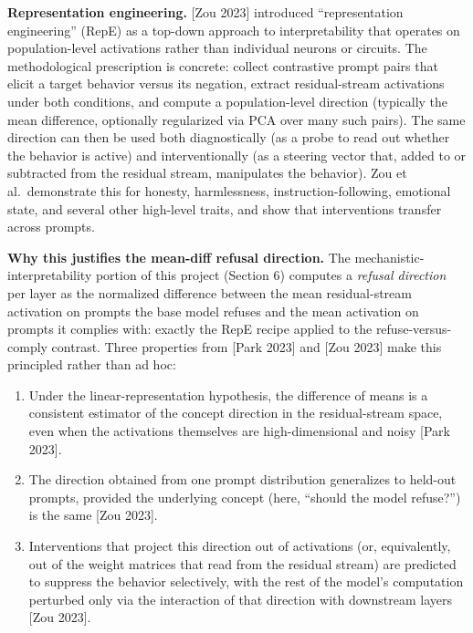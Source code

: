 \documentclass[
  11pt,
]{article}
\providecommand{\tightlist}{%
  \setlength{\itemsep}{0pt}\setlength{\parskip}{0pt}}
\begin{document}
\textbf{Representation engineering.} {[}Zou 2023{]} introduced
``representation engineering'' (RepE) as a top-down approach to
interpretability that operates on population-level activations rather
than individual neurons or circuits. The methodological prescription is
concrete: collect contrastive prompt pairs that elicit a target behavior
versus its negation, extract residual-stream activations under both
conditions, and compute a population-level direction (typically the mean
difference, optionally regularized via PCA over many such pairs). The
same direction can then be used both diagnostically (as a probe to read
out whether the behavior is active) and interventionally (as a steering
vector that, added to or subtracted from the residual stream,
manipulates the behavior). Zou et al.~demonstrate this for honesty,
harmlessness, instruction-following, emotional state, and several other
high-level traits, and show that interventions transfer across prompts.

\textbf{Why this justifies the mean-diff refusal direction.} The
mechanistic-interpretability portion of this project (Section 6)
computes a \emph{refusal direction} per layer as the normalized
difference between the mean residual-stream activation on prompts the
base model refuses and the mean activation on prompts it complies with:
exactly the RepE recipe applied to the refuse-versus-comply contrast.
Three properties from {[}Park 2023{]} and {[}Zou 2023{]} make this
principled rather than ad hoc:

\begin{enumerate}
\def\labelenumi{\arabic{enumi}.}
\tightlist
\item
  Under the linear-representation hypothesis, the difference of means is
  a consistent estimator of the concept direction in the residual-stream
  space, even when the activations themselves are high-dimensional and
  noisy {[}Park 2023{]}.
\item
  The direction obtained from one prompt distribution generalizes to
  held-out prompts, provided the underlying concept (here, ``should the
  model refuse?'') is the same {[}Zou 2023{]}.
\item
  Interventions that project this direction out of activations (or,
  equivalently, out of the weight matrices that read from the residual
  stream) are predicted to suppress the behavior selectively, with the
  rest of the model's computation perturbed only via the interaction of
  that direction with downstream layers {[}Zou 2023{]}.
\end{enumerate}
\end{document}
